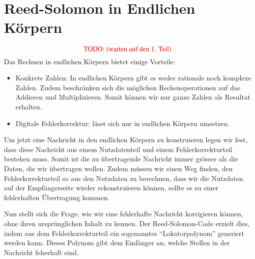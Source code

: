 %
%
%
\section{Reed-Solomon in Endlichen Körpern
\label{reedsolomon:section:endlichekoerper}}
\[
\textcolor{red}{\text{TODO: (warten auf den 1. Teil)}}
\]
Das Rechnen in endlichen Körpern bietet einige Vorteile:

\begin{itemize}
	\item Konkrete Zahlen: In endlichen Körpern gibt es weder rationale noch komplexe Zahlen. Zudem beschränken sich die möglichen Rechenoperationen auf das Addieren und Multiplizieren. Somit können wir nur ganze Zahlen als Resultat erhalten.
	
	\item Digitale Fehlerkorrektur: lässt sich nur in endlichen Körpern umsetzen. 
	
\end{itemize}

Um jetzt eine Nachricht in den endlichen Körpern zu konstruieren legen wir fest, dass diese Nachricht aus einem Nutzdatenteil und einem Fehlerkorrekturteil bestehen muss. Somit ist die zu übertragende Nachricht immer grösser als die Daten, die wir übertragen wollen. Zudem müssen wir einen Weg finden, den Fehlerkorrekturteil so aus den Nutzdaten zu berechnen, dass wir die Nutzdaten auf der Empfängerseite wieder rekonstruieren können, sollte es zu einer fehlerhaften Übertragung kommen.

Nun stellt sich die Frage, wie wir eine fehlerhafte Nachricht korrigieren können, ohne ihren ursprünglichen Inhalt zu kennen. Der Reed-Solomon-Code erzielt dies, indem aus dem Fehlerkorrekturteil ein sogenanntes ``Lokatorpolynom'' generiert werden kann. Dieses Polynom gibt dem Emfänger an, welche Stellen in der Nachricht feherhaft sind. 
